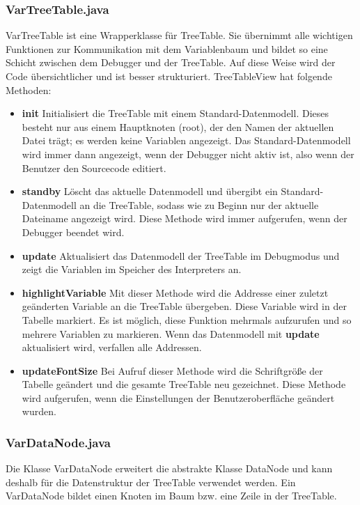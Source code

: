 \subsubsection*{VarTreeTable.java}
VarTreeTable ist eine Wrapperklasse für TreeTable. Sie übernimmt alle wichtigen Funktionen zur Kommunikation mit dem Variablenbaum und bildet so eine Schicht zwischen dem Debugger und der TreeTable. Auf diese Weise wird der Code übersichtlicher und ist besser strukturiert.
TreeTableView hat folgende Methoden:
\begin{itemize}
\item \textbf{init} Initialisiert die TreeTable mit einem Standard-Datenmodell. Dieses besteht nur aus einem Hauptknoten (root), der den Namen der aktuellen Datei trägt; es werden keine Variablen angezeigt. Das Standard-Datenmodell wird immer dann angezeigt, wenn der Debugger nicht aktiv ist, also wenn der Benutzer den Sourcecode editiert.
\item \textbf{standby} Löscht das aktuelle Datenmodell und übergibt ein Standard-Datenmodell an die TreeTable, sodass wie zu Beginn nur der aktuelle Dateiname angezeigt wird. Diese Methode wird immer aufgerufen, wenn der Debugger beendet wird.
\item \textbf{update} Aktualisiert das Datenmodell der TreeTable im Debugmodus und zeigt die Variablen im Speicher des Interpreters an.
\item \textbf{highlightVariable} Mit dieser Methode wird die Addresse einer zuletzt geänderten Variable an die TreeTable übergeben. Diese Variable wird in der Tabelle markiert. Es ist möglich, diese Funktion mehrmals aufzurufen und so mehrere Variablen zu markieren. Wenn das Datenmodell mit \textbf{update} aktualisiert wird, verfallen alle Addressen.
\item \textbf{updateFontSize} Bei Aufruf dieser Methode wird die Schriftgröße der Tabelle geändert und die gesamte TreeTable neu gezeichnet. Diese Methode wird aufgerufen, wenn die Einstellungen der Benutzeroberfläche geändert wurden.
\end{itemize}

\subsubsection*{VarDataNode.java}
Die Klasse VarDataNode erweitert die abstrakte Klasse DataNode und kann deshalb für die Datenstruktur der TreeTable verwendet werden. Ein VarDataNode bildet einen Knoten im Baum bzw. eine Zeile in der TreeTable.

